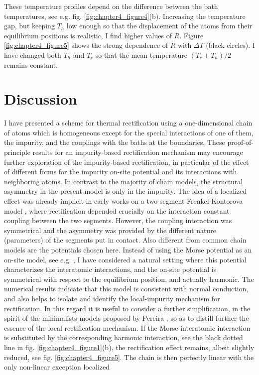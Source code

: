 These temperature profiles depend on the difference between the bath temperatures, see e.g. fig. \ref{fig:chapter4_figure4}(b). Increasing the temperature gap, but  keeping $T_h$ low enough so that the displacement of the atoms from their equilibrium positions is realistic, I find higher values of $R$. Figure \ref {fig:chapter4_figure5} shows the strong dependence of $R$ with $\Delta T$ (black circles). I have changed both $T_h$ and $T_c$ so that the mean temperature $(T_c+T_h)/2$ remains constant.

\section{Discussion\label{sec:chapter4_Discussion}}

I have presented  a scheme for thermal rectification using a one-dimensional chain of atoms which is homogeneous except
for the special interactions of one of them, the impurity, and the couplings with the baths at the boundaries. These proof-of-principle results for an impurity-based rectification mechanism may encourage further exploration of the impurity-based rectification, in particular of the effect of different forms for the impurity on-site potential and its interactions with neighboring atoms.
In contrast to the majority of chain models, the structural asymmetry in the present model is only in the impurity. The idea of a localized effect was already implicit in early works on a two-segment Frenkel-Kontorova
model \cite{Li2004,Hu2006}, where rectification depended crucially on the interaction constant coupling between the two segments.
However, the coupling interaction was symmetrical and the asymmetry was provided by the different nature
(parameters) of the segments put in contact.
Also different from common chain models are the potentials chosen here. Instead of using the Morse potential as an on-site model, see e.g.  \cite{Terraneo2002},
I have considered a natural setting where this potential characterizes the interatomic interactions,
and the on-site potential is symmetrical with respect to the equilibrium position, and actually harmonic.
The numerical results indicate that this model is consistent with normal conduction,
and also helps to isolate and identify the local-impurity mechanism for rectification.
In this regard it is useful to consider a further simplification, in the spirit of the minimalists models
proposed by Pereira \cite{Pereira2017}, so as to distill further the essence of the local rectification mechanism.
If the Morse interatomic interaction is substituted by the corresponding harmonic interaction, see the black dotted line in fig. \ref{fig:chapter4_figure1}(b), the rectification effect remains, albeit slightly reduced, see fig. \ref{fig:chapter4_figure5}. The chain is then perfectly linear with the only non-linear exception  localized
